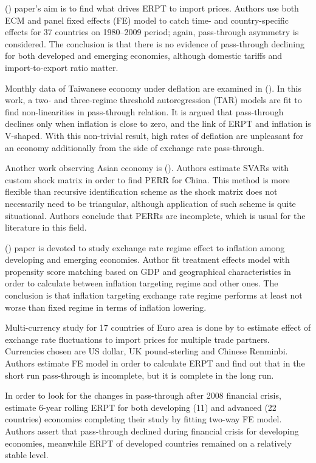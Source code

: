 \documentclass[12pt, a4paper]{extarticle}
\begin{document}
(\cite{BrunAguerre2012}) paper's aim is to find what drives ERPT to import prices. Authors use both ECM and panel fixed effects (FE) model to catch time- and country-specific effects for 37 countries on 1980--2009 period; again, pass-through asymmetry is considered. The conclusion is that there is no evidence of pass-through declining for both developed and emerging economies, although domestic tariffs and import-to-export ratio matter.

Monthly data of Taiwanese economy under deflation are examined in (\cite{Lin2012}). In this work, a two- and three-regime threshold autoregression (TAR) models are fit to find non-linearities in pass-through relation. It is argued that pass-through declines only when inflation is close to zero, and the link of ERPT and inflation is V-shaped. With this non-trivial result, high rates of deflation are unpleasant for an economy additionally from the side of exchange rate pass-through.

Another work observing Asian economy is (\cite{Jiang2013}). Authors estimate SVARs with custom shock matrix in order to find PERR for China. This method is more flexible than recursive identification scheme as the shock matrix does not necessarily need to be triangular, although application of such scheme is quite situational. Authors conclude that PERRs are incomplete, which is usual for the literature in this field.

(\cite{Yamada2013}) paper is devoted to study exchange rate regime effect to inflation among developing and emerging economies. Author fit treatment effects model with propensity score matching based on GDP and geographical characteristics in order to calculate between inflation targeting regime and other ones. The conclusion is that inflation targeting exchange rate regime performs at least not worse than fixed regime in terms of inflation lowering.

Multi-currency study for 17 countries of Euro area is done by \textcite{Bandt2014} to estimate effect of exchange rate fluctuations to import prices for multiple trade partners. Currencies chosen are US dollar, UK pound-sterling and Chinese Renminbi. Authors estimate FE model in order to calculate ERPT and find out that in the short run pass-through is incomplete, but it is complete in the long run.

In order to look for the changes in pass-through after 2008 financial crisis, \textcite{Jasova2016} estimate 6-year rolling ERPT for both developing (11) and advanced (22 countries) economies completing their study by fitting two-way FE model. Authors assert that pass-through declined during financial crisis for developing economies, meanwhile ERPT of developed countries remained on a relatively stable level.
\end{document}
